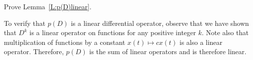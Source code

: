 \documentclass{ximera}
\begin{document}
\begin{exercise}  \label{c12.3.lem}
Prove Lemma~\ref{L:p(D)linear}.

\begin{solution}

To verify that $p(D)$ is a linear differential operator, observe that we have shown 
that $D^k$ is a linear operator on functions for any positive integer $k$.  Note also
that multiplication of functions by a constant $x(t)\mapsto cx(t)$ is also a linear
operator.  Therefore, $p(D)$ is the sum of linear operators and is therefore linear.


\end{solution}
\end{exercise}
\end{document}

